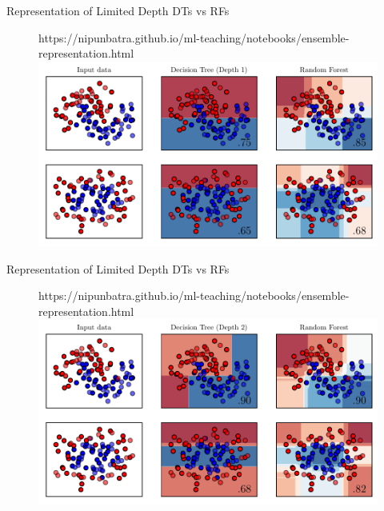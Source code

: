 \documentclass{beamer}
\begin{document}
\begin{frame}{Representation of Limited Depth DTs vs RFs}

\begin{figure}[htp]
  \centering
  \begin{notebookbox}{https://nipunbatra.github.io/ml-teaching/notebooks/ensemble-representation.html}
    \includegraphics[scale=0.6]{../assets/ensemble/figures/1-representation.pdf}
  \end{notebookbox}
\end{figure}

\end{frame}
\begin{frame}{Representation of Limited Depth DTs vs RFs}

  \begin{figure}[htp]
    \centering
    \begin{notebookbox}{https://nipunbatra.github.io/ml-teaching/notebooks/ensemble-representation.html}
      \includegraphics[scale=0.6]{../assets/ensemble/figures/2-representation.pdf}
    \end{notebookbox}
  \end{figure}
  
  \end{frame}
\end{document}
